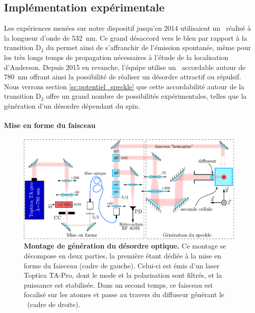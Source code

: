 \subsection{Implémentation expérimentale}
\label{sc:montage_diffuseur}
Les expériences menées sur notre dispositif jusqu'en 2014 utilisaient un \speckle\ réalisé à la longueur d'onde de \SI{532}{\nano\metre}. Ce grand désaccord vers le bleu par rapport à la transition $\mathrm{D}_2$ du  permet ainsi de s'affranchir de l'émission spontanée, même pour les très longs temps de propagation nécessaires à l'étude de la localisation d'Anderson. Depuis 2015 en revanche, l'équipe utilise un \speckle\ accordable autour de \SI{780}{\nano\metre} offrant ainsi la possibilité de réaliser un désordre attractif ou répulsif. Nous verrons section \ref{sc:potentiel_speckle} que cette accordabilité autour de la transition $\mathrm{D}_2$ offre un grand nombre de possibilités expérimentales, telles que la génération d'un désordre dépendant du spin.

\paragraph*{Mise en forme du faisceau \speckle}

\begin{figure}
\centering
\includegraphics[width=\textwidth]{Fig/Speckle/montage_speckle_taus.pdf}
\caption{\textbf{Montage de génération du désordre optique.} Ce montage se décompose en deux parties, la première étant dédiée à la mise en forme du faisceau (cadre de gauche). Celui-ci est émis d'un laser Toptica TA-Pro, dont le mode et la polarisation sont filtrés, et la puissance est stabilisée. Dans un second temps, ce faisceau est focalisé sur les atomes et passe au travers du diffuseur générant le \speckle\ (cadre de droite).}
\label{fig:montage_speckle_taus}
\end{figure}

